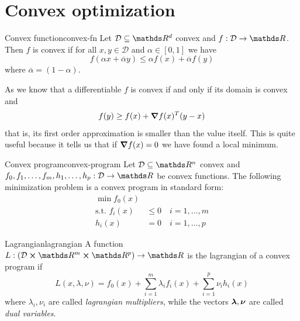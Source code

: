 \documentclass[12pt]{extarticle}
\renewcommand{\vec}[1]{\bvec{#1}}
\begin{document}
\section{Convex optimization}

\begin{definition}{Convex function}{convex-fn}
	Let $\mathcal D \subseteq \R^d$ convex and $f: \mathcal D \to \R$.
	Then $f$ is convex if for all $x, y \in \mathcal D$ and $\alpha \in [0, 1]$ we have
	\begin{equation}
		f(\alpha x + \overline{\alpha} y) \leq \alpha f(x) + \overline \alpha f(y)
	\end{equation}
	where $\overline \alpha = (1-\alpha)$.
\end{definition}

As we know that a differentiable $f$ is convex if and only if its domain is convex and
\begin{equation}
	f(y) \geq f(x) + \grad f(x)^T(y-x)
\end{equation}
that is, its first order approximation is smaller than the value itself.
This is quite useful because it tells us that if $\grad f(x) = 0$ we have found a local minimum.


\begin{definition}{Convex program}{convex-program}
	Let $\mathcal D \subseteq \R^n$ convex and $f_0, f_1, \dots, f_m, h_1, \dots, h_p: \mathcal D \to \R$
	be convex functions.
	The following minimization problem is a convex program in standard form:
	\begin{align}
		\min f_0(x)         &                              \\
		\text{s.t. }	f_i(x) & \leq 0 \quad i = 1, \dots, m \\
		h_i(x)              & = 0    \quad i = 1, \dots, p
	\end{align}
\end{definition}

\begin{definition}{Lagrangian}{lagrangian}
	A function $L: (\mathcal D \cross \R^m \cross \R^p) \to \R$ is the lagrangian of a convex
	program if
	\begin{equation}
		L(x, \lambda, \nu) = f_0(x) + \sum_{i = 1}^m \lambda_i f_i(x) + \sum_{i = 1}^p \nu_i h_i(x)
	\end{equation}
	where $\lambda_i, \nu_i$ are called \emph{lagrangian multipliers}, while
	the vectors $\vec \lambda, \vec \nu$ are called \emph{dual variables}.
\end{definition}
\end{document}

